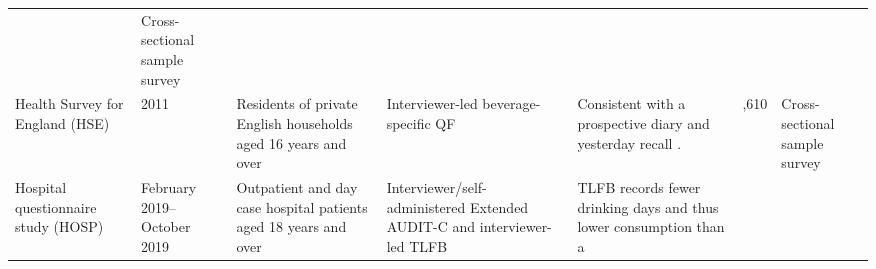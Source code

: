 \documentclass[]{article}
\begin{document}
\begin{longtable}[]{@{}lllllrl@{}}
\begin{minipage}[t]{0.07\columnwidth}
\end{minipage} & \begin{minipage}[t]{0.12\columnwidth}\raggedright
Cross-sectional sample survey\strut
\end{minipage}\tabularnewline
\begin{minipage}[t]{0.12\columnwidth}\raggedright
Health Survey for England (HSE) \citep{NatCenSocialResearch2013}\strut
\end{minipage} & \begin{minipage}[t]{0.12\columnwidth}\raggedright
2011\strut
\end{minipage} & \begin{minipage}[t]{0.12\columnwidth}\raggedright
Residents of private English households aged 16 years and over\strut
\end{minipage} & \begin{minipage}[t]{0.12\columnwidth}\raggedright
Interviewer-led beverage-specific QF\strut
\end{minipage} & \begin{minipage}[t]{0.12\columnwidth}\raggedright
Consistent with a prospective diary \citep{Boniface2014} and yesterday
recall \citep{Stockwell2016}.\strut
\end{minipage} & \begin{minipage}[t]{0.07\columnwidth}\raggedleft
8,610\strut
\end{minipage} & \begin{minipage}[t]{0.12\columnwidth}\raggedright
Cross-sectional sample survey\strut
\end{minipage}\tabularnewline
\begin{minipage}[t]{0.12\columnwidth}\raggedright
Hospital questionnaire study (HOSP)\strut
\end{minipage} & \begin{minipage}[t]{0.12\columnwidth}\raggedright
February 2019--October 2019\strut
\end{minipage} & \begin{minipage}[t]{0.12\columnwidth}\raggedright
Outpatient and day case hospital patients aged 18 years and over\strut
\end{minipage} & \begin{minipage}[t]{0.12\columnwidth}\raggedright
Interviewer/self-administered Extended AUDIT-C and interviewer-led
TLFB\strut
\end{minipage} & \begin{minipage}[t]{0.12\columnwidth}\raggedright
TLFB records fewer drinking days and thus lower consumption than a

\end{minipage}
\end{longtable}
\end{document}
